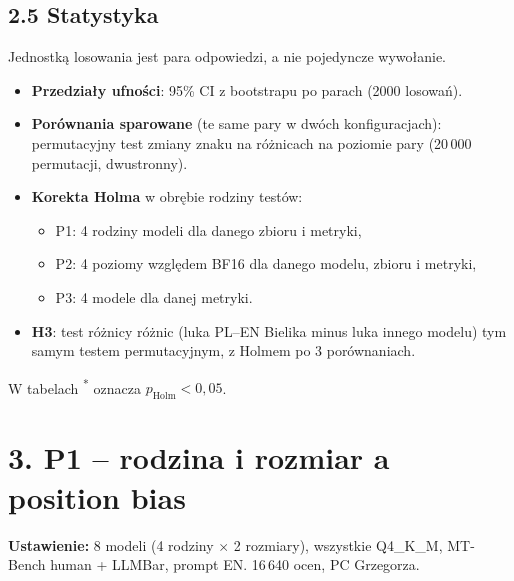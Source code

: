 \documentclass[10pt,a4paper]{article}
\newcommand{\s}{\textsuperscript{*}}
\begin{document}
\subsection*{2.5 Statystyka}
Jednostką losowania jest para odpowiedzi, a nie pojedyncze wywołanie.
\begin{itemize}
  \item \textbf{Przedziały ufności}: 95\% CI z bootstrapu po parach (2000 losowań).
  \item \textbf{Porównania sparowane} (te same pary w dwóch konfiguracjach): permutacyjny test zmiany znaku na różnicach na poziomie pary (20\,000 permutacji, dwustronny).
  \item \textbf{Korekta Holma} w obrębie rodziny testów:
    \begin{itemize}
      \item P1: 4 rodziny modeli dla danego zbioru i metryki,
      \item P2: 4 poziomy względem BF16 dla danego modelu, zbioru i metryki,
      \item P3: 4 modele dla danej metryki.
    \end{itemize}
  \item \textbf{H3}: test różnicy różnic (luka PL--EN Bielika minus luka innego modelu) tym samym testem permutacyjnym, z Holmem po 3 porównaniach.
\end{itemize}
W tabelach \s{} oznacza $p_{\text{Holm}}<0{,}05$.

\section*{3. P1 -- rodzina i rozmiar a position bias}
\textbf{Ustawienie:} 8 modeli (4 rodziny $\times$ 2 rozmiary), wszystkie Q4\_K\_M, MT-Bench human + LLMBar, prompt EN. 16\,640 ocen, PC Grzegorza.
\end{document}
